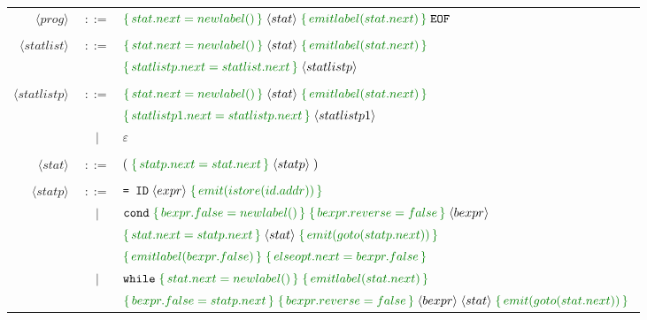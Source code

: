 \documentclass[a4paper]{article}
\newcommand{\cmd}[1]{\textcolor{MyGreen}{\{\, #1 \,\}} \;}
\newcommand{\node}[1]{\langle #1 \rangle \;}
\newcommand{\tag}[1]{\texttt{#1} \;}
\begin{document}
\begin{center}
\begin{tabular}{ r c l }
  $\node{prog}$       & $::=$ & $\cmd{stat.next = newlabel()} \node{stat} \cmd{emitlabel(stat.next)} \tag{EOF}$ \\\\
  $\node{statlist}$   & $::=$ & $\cmd{stat.next = newlabel()} \node{stat} \cmd{emitlabel(stat.next)}$ \\ 
                      &       & $\cmd{statlistp.next = statlist.next}\node{statlistp}$ \\\\
  $\node{statlistp}$  & $::=$ & $\cmd{stat.next = newlabel()} \node{stat} \cmd{emitlabel(stat.next)}$ \\ 
                      &       & $\cmd{statlistp1.next = statlistp.next}\node{statlistp1}$ \\

                      &  $|$  & $\varepsilon$ \\\\
  $\node{stat}$       & $::=$ & $(\; \cmd{statp.next = stat.next} \node{statp})$ \\\\
  $\node{statp}$      & $::=$ & $\texttt{= ID}\; \node{expr} \cmd{emit(istore(id.addr))}$ \\

                      &  $|$  & $\tag{cond} \cmd{bexpr.false = newlabel()} \cmd{bexpr.reverse = false} \node{bexpr}$ \\
                      &       & $\cmd{stat.next = statp.next} \node{stat} \cmd{emit(goto(statp.next))}$ \\
                      &       & $\cmd{emitlabel(bexpr.false)} \cmd{elseopt.next = bexpr.false}$ \\

                      &  $|$  & $\tag{while} \cmd{stat.next = newlabel()} \cmd{emitlabel(stat.next)}$ \\
                      &       & $\cmd{bexpr.false = statp.next} \cmd{bexpr.reverse = false} \node{bexpr} \node{stat} \cmd{emit(goto(stat.next))}$ \\


\end{tabular}
\end{center}
\end{document}
